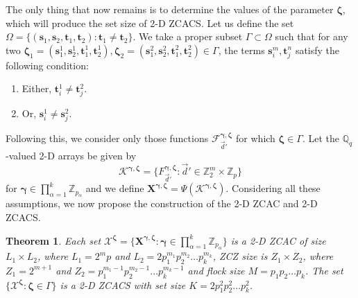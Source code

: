 \documentclass[pdflatex,sn-mathphys-num]{sn-jnl}%
\theoremstyle{thmstyleone}
\newtheorem{theorem}{Theorem}
\begin{document}
	The only thing that now remains is to determine the values of the parameter $\bm{\zeta}$, which will produce the set size of 2-D ZCACS.
	Let us define the set $\Omega= \{ (\mathbf{s}_1, \mathbf{s}_2, \mathbf{t}_1, \mathbf{t}_2) : \mathbf{t}_1 \neq \mathbf{t}_2\}$. We take a proper subset  $\Gamma \subset \Omega$ such that for any two $\bm{\zeta}_1= (\mathbf{s}_1^1, \mathbf{s}_2^1, \mathbf{t}_1^1, \mathbf{t}_2^1), \bm{\zeta}_2= (\mathbf{s}_1^2, \mathbf{s}_2^2, \mathbf{t}_1^2, \mathbf{t}_2^2) \in \Gamma$, the terms $\mathbf{s}_i^m,\mathbf{t}_j^n$ satisfy the following condition:
	\begin{enumerate}
		\item Either, $\mathbf{t}_i^1 \neq \mathbf{t}_j^2$.
		
		\item Or, $\mathbf{s}_i^1 \neq \mathbf{s}_j^2$.
	\end{enumerate}
	Following this, we consider only those functions $\mathcal{F}_{\vec{d}'}^{\bm{\gamma}, \bm{\zeta}}$	for which $\bm{\zeta} \in \Gamma$.  Let the $\mathbb{Q}_q$-valued 2-D arrays be given by
	\begin{equation}
		\mathcal{K}^{\bm{\gamma},\bm{\zeta}} = \{ F_{ \vec{d}'}^{\bm{\gamma}, \bm{\zeta}} : \vec{d}' \in \mathbb{Z}_2^{m}  \times \mathbb{Z}_p \}
	\end{equation}
	for $\bm{\gamma} \in \prod_{\alpha=1}^{k} \mathbb{Z}_{p_\alpha}$ and we define $\mathbf{X}^{\bm{\gamma},\bm{\zeta}} = \Psi (\mathcal{K}^{\bm{\gamma}, \bm{\zeta}})$.
	Considering all these assumptions, we now propose the construction of the 2-D ZCAC and 2-D ZCACS.
	
	
	
	\begin{theorem}\label{thm_ZCACS}
		Each set $\mathcal{X}^{\bm{\zeta}}= \{\mathbf{X}^{\bm{\gamma},\bm{\zeta}}: \bm{\gamma} \in \prod_{\alpha=1}^{k} \mathbb{Z}_{p_\alpha}\}$ is a 2-D ZCAC of size  $L_1 \times L_2$, where $L_1= 2^m p$ and $L_2= 2 p_1^{m_1} p_2^{m_2} \dots p_k^{m_k}$, ZCZ size is $Z_1 \times Z_2$,  where $Z_1= 2^{m+1} $ and $Z_2=  p_1^{m_1-1} p_2^{m_2-1} \dots p_k^{m_k-1}$ and flock size $M= p_1 p_2 \dots p_k$. The set $\{ \mathcal{X}^{\bm{\zeta}}: \bm{\zeta} \in \Gamma\}$ is a 2-D ZCACS with set size $K= 2p_1^2 p_2^2 \dots p_k^2$.
	\end{theorem} 
	
\end{document}
